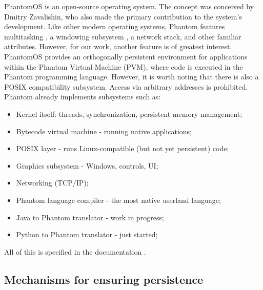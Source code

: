 PhantomOS is an open-source operating system. The concept was conceived by Dmitry Zavalishin, who also made the primary contribution to the system’s development. Like other modern operating systems, Phantom features multitasking \cite{Habr_MT, Habr_Preempt, Habr_Sched}, a windowing subsystem \cite{Habr_UI}, a network stack, and other familiar attributes. However, for our work, another feature is of greatest interest. PhantomOS provides an orthogonally persistent environment for applications within the Phantom Virtual Machine (PVM), where code is executed in the Phantom programming language. However, it is worth noting that there is also a POSIX compatibility subsystem. Access via arbitrary addresses is prohibited. Phantom already implements subsystems such as:
\begin{itemize}
    \item Kernel itself: threads, synchronization, persistent memory management;
    \item Bytecode virtual machine - running native applications;
    \item POSIX layer - runs Linux-compatible (but not yet persistent) code;
    \item Graphics subsystem - Windows, controls, UI;
    \item Networking (TCP/IP);
    \item Phantom language compiler - the most native userland language;
    \item Java to Phantom translator - work in progress;
    \item Python to Phantom translator - just started;
\end{itemize}
All of this is specified in the documentation \cite{Phantom_docs}.

\subsection{Mechanisms for ensuring persistence}

